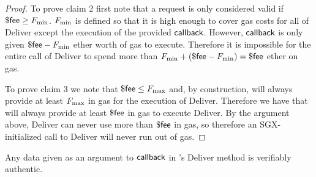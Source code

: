 \begin{proof}
To prove claim 2 first note that a request is only considered valid if $\${\sf fee} \geq F_{\rm min}$.
$F_{\rm min}$ is defined so that it is high enough to cover gas costs for all of Deliver except the execution of the provided ${\sf callback}$.
However, ${\sf callback}$ is only given $\${\sf fee} - F_{\rm min}$ ether worth of gas to execute.
Therefore it is impossible for the entire call of Deliver to spend more than $F_{\rm min} + (\${\sf fee} - F_{\rm min}) = \${\sf fee}$ ether on gas.

To prove claim 3 we note that $\${\sf fee} \leq F_{\rm max}$ and, by construction, \sgxadd will always provide at least $F_{\rm max}$ in gas for the execution of Deliver.
Therefore we have that \sgxadd will always provide at least $\${\sf fee}$ in gas to execute Deliver.
By the argument above, Deliver can never use more than $\${\sf fee}$ in gas, so therefore an SGX-initialized call to Deliver will never run out of gas.
\end{proof}



\begin{lemma} \label{lem:authentic-delivery}
Any data given as an argument to ${\sf callback}$ in \tcont's Deliver method is verifiably authentic.
\end{lemma}


